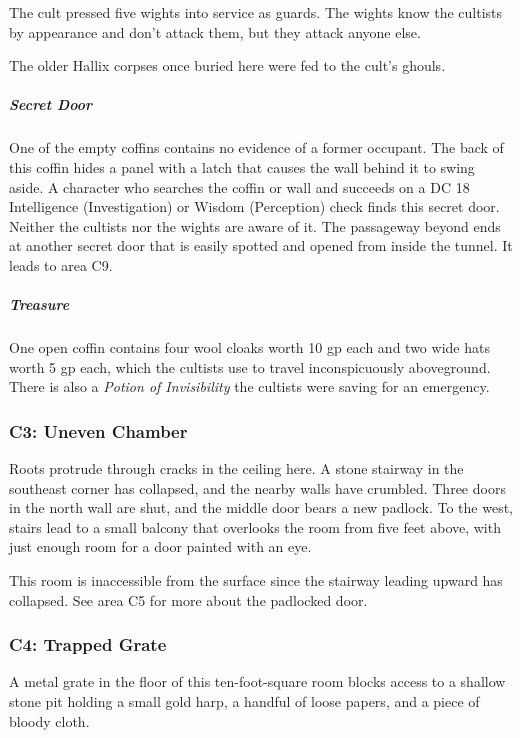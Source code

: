 \documentclass[10pt,a4paper,twoside,bg=print,twocolumn,openany,nodeprecatedcode]{dndbook}
\begin{document}
The cult pressed five wights into service as guards. The wights know the cultists by appearance and don't attack them, but they attack anyone else.

The older Hallix corpses once buried here were fed to the cult's ghouls.

\subparagraph{Secret Door}
One of the empty coffins contains no evidence of a former occupant. The back of this coffin hides a panel with a latch that causes the wall behind it to swing aside. A character who searches the coffin or wall and succeeds on a DC 18 Intelligence (Investigation) or Wisdom (Perception) check finds this secret door. Neither the cultists nor the wights are aware of it. The passageway beyond ends at another secret door that is easily spotted and opened from inside the tunnel. It leads to area C9.

\subparagraph{Treasure}
One open coffin contains four wool cloaks worth 10 gp each and two wide hats worth 5 gp each, which the cultists use to travel inconspicuously aboveground. There is also a \textit{Potion of Invisibility} the cultists were saving for an emergency.

\subsubsection{C3: Uneven Chamber}
\begin{DndReadAloud}{}
Roots protrude through cracks in the ceiling here. A stone stairway in the southeast corner has collapsed, and the nearby walls have crumbled. Three doors in the north wall are shut, and the middle door bears a new padlock. To the west, stairs lead to a small balcony that overlooks the room from five feet above, with just enough room for a door painted with an eye.

\end{DndReadAloud}

This room is inaccessible from the surface since the stairway leading upward has collapsed. See area C5 for more about the padlocked door.

\subsubsection{C4: Trapped Grate}
\begin{DndReadAloud}{}
A metal grate in the floor of this ten-foot-square room blocks access to a shallow stone pit holding a small gold harp, a handful of loose papers, and a piece of bloody cloth.

\end{DndReadAloud}
\end{document}
